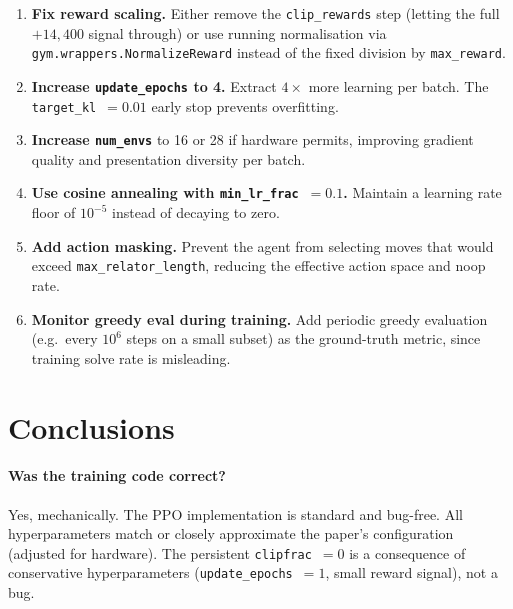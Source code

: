 \documentclass[11pt,a4paper]{article}
\begin{document}
\begin{enumerate}
  \item \textbf{Fix reward scaling.}  Either remove the \texttt{clip\_rewards}
    step (letting the full $+14{,}400$ signal through) or use running
    normalisation via \texttt{gym.wrappers.NormalizeReward} instead of the fixed
    division by \texttt{max\_reward}.

  \item \textbf{Increase \texttt{update\_epochs} to 4.}  Extract $4\times$ more
    learning per batch.  The \texttt{target\_kl}~$= 0.01$ early stop prevents
    overfitting.

  \item \textbf{Increase \texttt{num\_envs}} to 16 or 28 if hardware permits,
    improving gradient quality and presentation diversity per batch.

  \item \textbf{Use cosine annealing with \texttt{min\_lr\_frac}~$= 0.1$.}
    Maintain a learning rate floor of $10^{-5}$ instead of decaying to zero.

  \item \textbf{Add action masking.}  Prevent the agent from selecting moves
    that would exceed \texttt{max\_relator\_length}, reducing the effective
    action space and noop rate.

  \item \textbf{Monitor greedy eval during training.}  Add periodic greedy
    evaluation (e.g.\ every $10^6$ steps on a small subset) as the ground-truth
    metric, since training solve rate is misleading.
\end{enumerate}

\section{Conclusions}\label{sec:conclusions}

\paragraph{Was the training code correct?}
Yes, mechanically.  The PPO implementation is standard and bug-free.  All
hyperparameters match or closely approximate the paper's configuration
(adjusted for hardware).  The persistent \texttt{clipfrac}~$= 0$ is a
consequence of conservative hyperparameters (\texttt{update\_epochs}~$= 1$,
small reward signal), not a bug.
\end{document}

